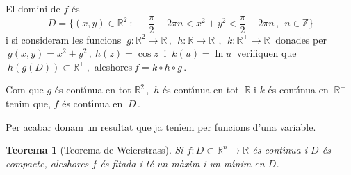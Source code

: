 \documentclass[12pt]{article}
\newtheorem{teorema}{Teorema}[subsection]
\newcommand{\Z}{\mathbb{Z}}
\newcommand{\R}{\mathbb{R}}
\begin{document}
\begin{itemize}
  El domini de $f$ {\'e}s
  $$D=\{ (x,y)\in\R^2\ :\ -\frac{\pi}{2}+2\pi n < x^2 +y^2 <
  \frac{\pi}{2}+2\pi n\,,\ \ n\in\Z\}$$
   i si consideram les funcions
  $\ g:\R^2\longrightarrow\R\,,\ \ h:\R\longrightarrow\R\ \,,\ \ k:\R^+\longrightarrow\R\ $ donades per $\ g(x,y)=x^2+y^2\,, \ h(z)=\cos z\ $  i
  $\ k(u)=\ln u\ $ verifiquen que   $\ h(g(D))\subset \R^+\,, $ aleshores$\ f=k\circ h\circ g\,.$

Com que $g$ {\'e}s cont{\'\i}nua en tot $\R^2\,, $  $h$ {\'e}s
  cont{\'\i}nua en tot $\ \R$ i $k$ {\'e}s cont{\'\i}nua en $\ \R^+\ $ tenim que, $f$ {\'e}s
  cont{\'\i}nua en $\ D\,.$

  \end{itemize}



Per acabar donam un resultat que ja ten{\'\i}em per funcions d'una variable.


\vspace{0.4cm}
\begin{teorema}[Teorema de Weierstrass]
Si $f:D\subset \R^n \longrightarrow \R$ {\'e}s cont{\'\i}nua i $D$ {\'e}s compacte,
aleshores $f$ {\'e}s fitada i t{\'e} un m{\`a}xim i un m{\'\i}nim en $D$.
\end{teorema}
\end{document}
